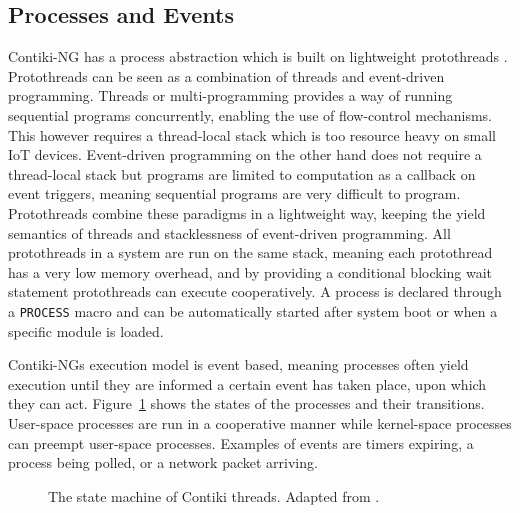 \documentclass[0-thesis.tex]{subfiles}
\begin{document}
\subsection{Processes and Events}
\label{ssec:process-event}
Contiki-NG has a process abstraction which is built on lightweight protothreads
\parencite{protothreads}. Protothreads can be seen as a combination of threads and
event-driven programming. Threads or multi-programming provides a way of running
sequential programs concurrently, enabling the use of flow-control mechanisms. This
however requires a thread-local stack which is too resource heavy on small IoT devices.
Event-driven programming on the other hand does not require a thread-local stack but
programs are limited to computation as a callback on event triggers, meaning sequential
programs are very difficult to program. Protothreads combine these paradigms in a
lightweight way, keeping the yield semantics of threads and stacklessness of event-driven
programming. All protothreads in a system are run on the same stack, meaning each
protothread has a very low memory overhead, and by providing a conditional blocking wait
statement protothreads can execute cooperatively. A process is declared through a
\texttt{PROCESS} macro and can be automatically started after system boot or when a
specific module is loaded. 

Contiki-NGs execution model is event based, meaning processes often yield execution until
they are informed a certain event has taken place, upon which they can act.
Figure~\ref{fig:state-machine} shows the states of the processes and their transitions.
User-space processes are run in a cooperative manner while kernel-space processes can
preempt user-space processes. Examples of events are timers expiring, a process being
polled, or a network packet arriving.

\begin{figure}
    \label{fig:state-machine}
    \caption{The state machine of Contiki threads. Adapted from \parencite{contiki-multithreading}.}
\end{figure}
\end{document}

